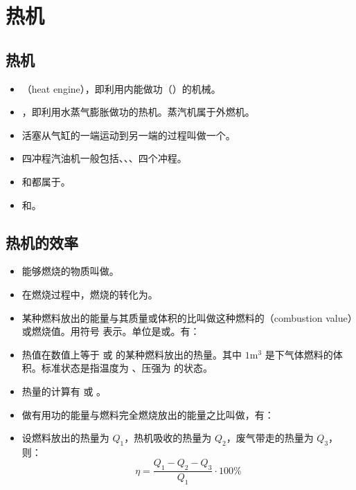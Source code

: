 \section{热机}

\subsection{热机}
\begin{itemize}
\item {}（heat engine），即利用内能做功（）的机械。
\item {}，即利用水蒸气膨胀做功的热机。蒸汽机属于外燃机。
\item 活塞从气缸的一端运动到另一端的过程叫做一个。
\item 四冲程汽油机一般包括、、、四个冲程。
\item {}和都属于。
\item {}和。
\end{itemize}

\subsection{热机的效率}
\begin{itemize}
\item 能够燃烧的物质叫做。
\item 在燃烧过程中，燃烧的转化为。
\item 某种燃料放出的能量与其质量或体积的比叫做这种燃料的（combustion value）或燃烧值。用符号  表示。单位是或。有：
\item 热值在数值上等于  或  的某种燃料放出的热量。其中 $1\text{m}^3$ 是下气体燃料的体积。标准状态是指温度为 、压强为  的状态。
\item 热量的计算有  或 。
\item 做有用功的能量与燃料完全燃烧放出的能量之比叫做，有：
\item 设燃料放出的热量为 $Q_1$，热机吸收的热量为 $Q_2$，废气带走的热量为 $Q_3$，则：
$$
\eta=\frac{Q_1-Q_2-Q_3}{Q_1}\cdot100\%
$$
\end{itemize}